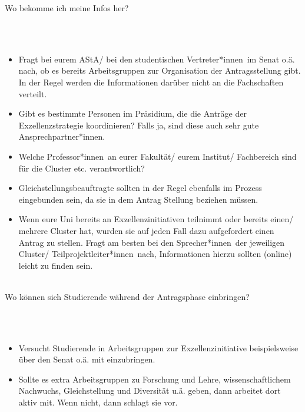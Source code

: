 \documentclass[DIV=calc]{scrartcl}
\newcommand{\gen}{*innen}
\begin{document}
\begin{minipage}{0.95\textwidth}
Wo bekomme ich meine Infos her?\\\\
    \begin{minipage}{0.05\textwidth}
        ~ %
    \end{minipage}
    \begin{minipage}{0.95\textwidth}
    \begin{itemize}
    \item Fragt bei eurem AStA/ bei den studentischen Vertreter\gen\ im Senat o.ä. nach, ob es bereits Arbeitsgruppen zur Organisation der Antragsstellung gibt. In der Regel werden die Informationen darüber nicht an die Fachschaften verteilt.
    \item Gibt es bestimmte Personen im Präsidium, die die Anträge der Exzellenzstrategie koordinieren? Falls ja, sind diese auch sehr gute Ansprechpartner\gen.
    \item Welche Professor\gen\ an eurer Fakultät/ eurem Institut/ Fachbereich sind für die Cluster etc. verantwortlich?
    \item Gleichstellungsbeauftragte sollten in der Regel ebenfalls im Prozess eingebunden sein, da sie in dem Antrag Stellung beziehen müssen.
    \item Wenn eure Uni bereits an Exzellenzinitiativen  teilnimmt oder bereits einen/ mehrere Cluster hat, wurden sie auf jeden Fall dazu aufgefordert einen Antrag zu stellen. Fragt am besten bei den Sprecher\gen\ der jeweiligen Cluster/ Teilprojektleiter\gen\ nach, Informationen hierzu sollten (online) leicht zu finden sein.
    \end{itemize}
    \end{minipage}\vspace{2\baselineskip}\\
    Wo können sich Studierende während der Antragsphase einbringen?\\\\
    \begin{minipage}{0.05\textwidth}
        ~ %
    \end{minipage}
    \begin{minipage}{0.95\textwidth}
    \begin{itemize}
    \item Versucht Studierende in Arbeitsgruppen zur Exzellenzinitiative beispielsweise über den Senat o.ä. mit einzubringen.
    \item Sollte es extra Arbeitsgruppen zu Forschung und Lehre, wissenschaftlichem Nachwuchs, Gleichstellung und Diversität u.ä. geben, dann arbeitet dort aktiv mit. Wenn nicht, dann schlagt sie vor.

\end{itemize}
\end{minipage}
\end{minipage}
\end{document}
